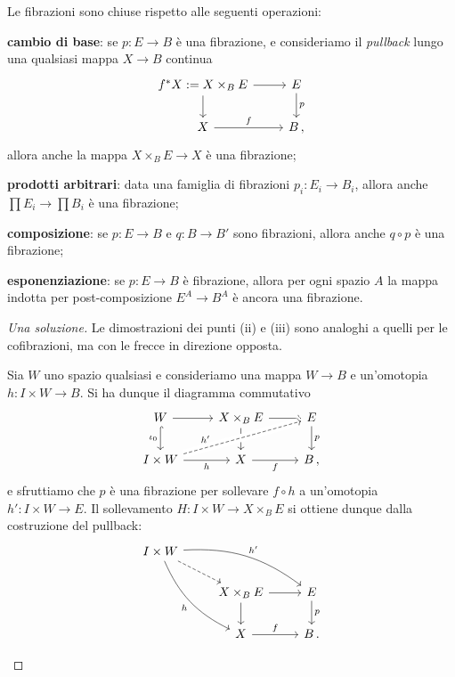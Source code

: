 \begin{exercise!}\label{fib-prop}
	Le fibrazioni sono chiuse rispetto alle seguenti operazioni:
	\begin{rmnumerate}	
	\item \textbf{cambio di base}:
	se $p:E \to B$ è una fibrazione,
	e consideriamo il \emph{pullback}
	lungo una qualsiasi mappa $X \to B$ continua 
	\begin{equation*}
		\begin{tikzcd}
			f^*X := X \times_{B} E \ar[d] \ar[r] & E \ar[d, "p"] \\
			X \ar[r, "f"] & B\,,
		\end{tikzcd}
	\end{equation*}
	allora anche la mappa $X \times_{B} E \to X$ è una fibrazione;
	
	\item \textbf{prodotti arbitrari}: data una famiglia di fibrazioni $p_{i}:E_{i} \to B_{i}$,
	allora anche $\prod E_{i} \to \prod B_{i}$ è una fibrazione;
	
	\item \textbf{composizione}: se $p: E \to  B$ e $q:B \to B'$ sono fibrazioni,
	allora anche $q \circ p$ è una fibrazione; 
	
	\item \textbf{esponenziazione}:
	se $p:E \to B$ è fibrazione,
	allora per ogni spazio $A$ la mappa indotta per post-composizione
	$E^{A} \to B^{A}$ è ancora una fibrazione.
	\end{rmnumerate}
	\begin{proof}[Una soluzione]
		Le dimostrazioni dei punti (ii) e (iii) sono analoghi a quelli per le cofibrazioni,
		ma con le frecce in direzione opposta.
		\begin{rmnumerate}
			\item Sia $W$ uno spazio qualsiasi e consideriamo una mappa $W \to B$
			e un'omotopia $h:I \times W \to B$. 
			Si ha dunque il diagramma commutativo
			\begin{equation*}
				\begin{tikzcd}
					W \ar[r] \ar[d, "\iota_{0}"', hook] & X \times_{B} E \ar[d] \ar[r] & E \ar[d, "p"] \\
					I \times W \ar[r, "h"'] \ar[rru, dashed, "h'", crossing over, near start] 
					& X \ar[r, "f"'] & B\,,
				\end{tikzcd}
			\end{equation*}
			e sfruttiamo che $p$ è una fibrazione per sollevare $f \circ h$
			a un'omotopia $h':I \times W \to E$. Il sollevamento $H:I \times W \to X \times_{B} E$ 
			si ottiene dunque dalla costruzione del pullback:
			\begin{equation*}
			\begin{tikzcd}
				I \times W \ar[dr, dashed] \ar[rrd, "h'", bend left=20pt] 
				\ar[ddr, "h"', bend right=20pt] & & \\
				& X \times_{B} E \ar[d] \ar[r] & E \ar[d, "p"] \\
				& X \ar[r, "f"] & B\,.
			\end{tikzcd}
			\end{equation*}
			

\end{rmnumerate}
\end{proof}
\end{exercise!}

